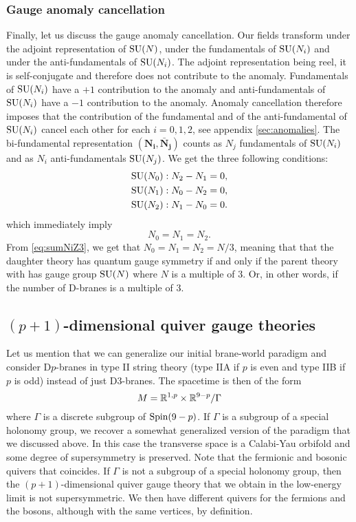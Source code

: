         \subsubsection{Gauge anomaly cancellation}
        
            Finally, let us discuss the gauge anomaly cancellation. Our fields transform under the adjoint representation of $\text{SU}(N)$, under the fundamentals of $\text{SU}(N_i)$ and under the anti-fundamentals of $\text{SU}(N_i)$. The adjoint representation being reel, it is self-conjugate and therefore does not contribute to the anomaly. Fundamentals of $\text{SU}(N_i)$ have a $+1$ contribution to the anomaly and anti-fundamentals of $\text{SU}(N_i)$ have a $-1$ contribution to the anomaly. Anomaly cancellation therefore imposes that the contribution of the fundamental and of the anti-fundamental of $\text{SU}(N_i)$ cancel each other for each $i=0,1,2$, see appendix \eqref{sec:anomalies}. The bi-fundamental representation $(\boldsymbol{\textbf{N}_i},\boldsymbol{\bar{\textbf{N}}_j})$ counts as $N_j$ fundamentals of $\text{SU}(N_i)$ and as $N_i$ anti-fundamentals $\text{SU}(N_j)$. We get the three following conditions:
            \begin{align}
                \text{SU}(N_0) &: N_2-N_1 = 0,\\
                \text{SU}(N_1) &: N_0-N_2 = 0,\\
                \text{SU}(N_2) &: N_1-N_0 = 0.
            \end{align}
            which immediately imply
            \begin{equation}
                N_0=N_1=N_2.
            \end{equation}
            From \eqref{eq:sumNiZ3}, we get that $N_0=N_1=N_2=N/3$, meaning that that the daughter theory has quantum gauge symmetry if and only if the parent theory with has gauge group $\text{SU}(N)$ where $N$ is a multiple of $3$. Or, in other words, if the number of D-branes is a multiple of $3$.

    \subsection{$(p+1)$-dimensional quiver gauge theories}

        Let us mention that we can generalize our initial brane-world paradigm and consider D$p$-branes in type II string theory (type IIA if $p$ is even and type IIB if $p$ is odd) instead of just D$3$-branes. The spacetime is then of the form
        \begin{equation}
            M = \mathbb{R}^{1,p}\times\mathbb{R}^{9-p}/\Gamma
        \end{equation}
        where $\Gamma$ is a discrete subgroup of $\text{Spin}(9-p)$. If $\Gamma$ is a subgroup of a special holonomy group, we recover a somewhat generalized version of the paradigm that we discussed above. In this case the transverse space is a Calabi-Yau orbifold and some degree of supersymmetry is preserved. Note that the fermionic and bosonic quivers that coincides. If $\Gamma$ is not a subgroup of a special holonomy group, then the $(p+1)$-dimensional quiver gauge theory that we obtain in the low-energy limit is not supersymmetric. We then have different quivers for the fermions and the bosons, although with the same vertices, by definition.

